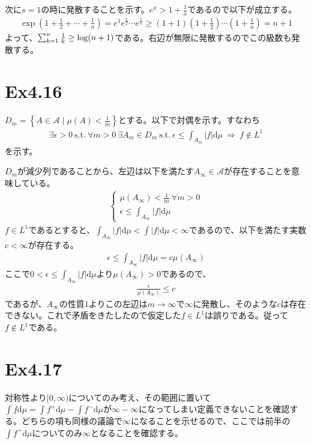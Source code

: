 \documentclass{article}
\begin{document}
次に$s = 1$の時に発散することを示す。$e^x > 1 + \frac{1}{x}$であるので以下が成立する。
\begin{align*}
	\exp \left( 1 + \frac{1}{2} + \cdots + \frac{1}{n} \right) = e^1  e^{\frac{1}{2}}\cdots e^{\frac{1}{n}} \geq (1 + 1) (1 + \frac{1}{2}) \cdots (1 + \frac{1}{n}) = n+1
\end{align*}
よって、$\sum_{k = 1}^{n} \frac{1}{k} \geq {\rm log} (n+1)$である。右辺が無限に発散するのでこの級数も発散する。

\section{Ex4.16}
$D_m = \left\{ A\in \mathcal{A}\mid \mu(A) < \frac{1}{m} \right\}$とする。以下で対偶を示す。すなわち
\begin{align*}
	\exists \epsilon > 0\ \text{s.t.}\ \forall m > 0\ \exists A_m \in D_m\ \text{s.t.}\ \epsilon \leq \int_{A_m} |f| \mathrm{d}\mu\ \Rightarrow\ f\notin L^1
\end{align*}
を示す。

$D_m$が減少列であることから、左辺は以下を満たす$A_{\infty}\in \mathcal{A}$が存在することを意味している。
\begin{align*}
\begin{cases}
	\mu\left( A_{\infty} \right) < \frac{1}{m}\ \forall m > 0\\[8pt]
	\epsilon \leq \int_{A_{\infty}} |f|\mathrm{d} \mu
\end{cases}
\end{align*}
$f\in L^1$であるとすると、$\int_{A_{\infty}} |f|\mathrm{d} \mu < \int |f| \mathrm{d} \mu < \infty$であるので、以下を満たす実数$c< \infty$が存在する。
\begin{align*}
	\epsilon \leq \int_{A_{\infty}} |f|\mathrm{d} \mu = c\mu\left( A_{\infty} \right)
\end{align*}
ここで$0 < \epsilon \leq \int_{A_{\infty}} |f|\mathrm{d} \mu$より$\mu\left( A_{\infty} \right)  > 0$であるので、
\begin{align*}
	\frac{\epsilon}{\mu\left( A_{\infty} \right)} \leq c
\end{align*}
であるが、$A_{\infty}$の性質1よりこの左辺は$m \to \infty$で$\infty$に発散し、そのような$c$は存在できない。これで矛盾をきたしたので仮定した$f \in L^1$は誤りである。従って$f \notin L^1$である。


\section{Ex4.17}
対称性より$[0,\infty)$についてのみ考え、その範囲に置いて$\int f \mathrm{d}\mu = \int f^{+} \mathrm{d}\mu - \int f^{-} \mathrm{d}\mu$が$\infty - \infty$になってしまい定義できないことを確認する。どちらの項も同様の議論で$\infty$になることを示せるので、ここでは前半の$\int f^{+} \mathrm{d}\mu$についてのみ$\infty$となることを確認する。
\end{document}
